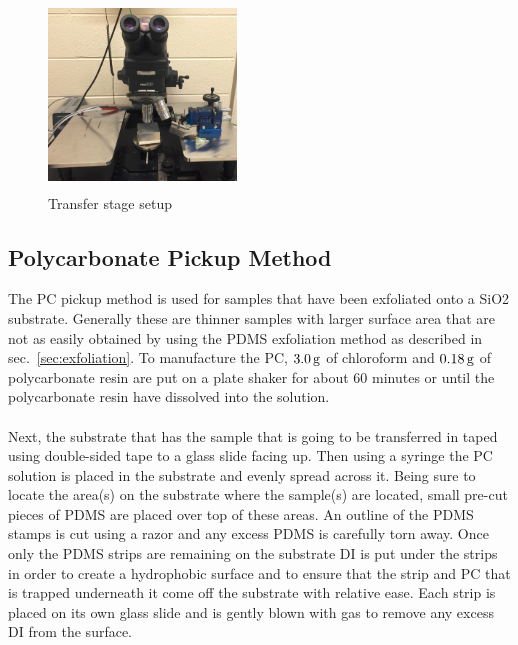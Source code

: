 \begin{figure}[ht]
	\centering
	\includegraphics[height=5cm,width=5cm]{figs/experimental/transfer_stage_setup}
	\caption[Transfer stage setup]{Transfer stage setup}
	\label{fig:transfer_stage_setup}
\end{figure}
\subsection{Polycarbonate Pickup Method}\label{subsec:pc_pickup}
The PC pickup method is used for samples that have been exfoliated onto a \acs{SiO2} substrate. Generally these are thinner samples with larger surface area that are not as easily obtained by using the PDMS exfoliation method as described in sec.~\ref{sec:exfoliation}. To manufacture the PC, $3.0\,\mathrm{g}$ of chloroform and $0.18\,\mathrm{g}$ of polycarbonate resin are put on a plate shaker for about 60 minutes or until the polycarbonate resin have dissolved into the solution. \\ \\
\noindent Next, the substrate that has the sample that is going to be transferred in taped using double-sided tape to a glass slide facing up. Then using a syringe the \acs{PC} solution is placed in the substrate and evenly spread across it. Being sure to locate the area(s) on the substrate where the sample(s) are located, small pre-cut pieces of PDMS are placed over top of these areas. An outline of the \acs{PDMS} stamps is cut using a razor and any excess \acs{PDMS} is carefully torn away. Once only the \acs{PDMS} strips are remaining on the substrate \ac{DI} is put under the strips in order to create a hydrophobic surface and to ensure that the strip and PC that is trapped underneath it come off the substrate with relative ease. Each strip is placed on its own glass slide and is gently blown with  gas to remove any excess \acs{DI} from the surface. \\ \\
